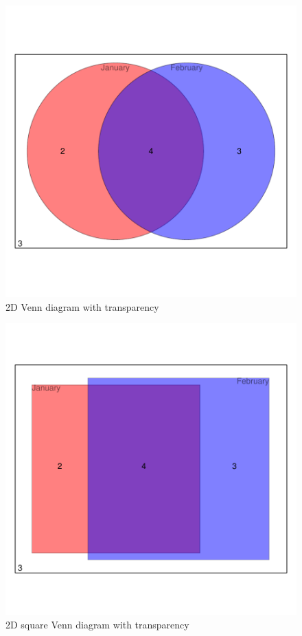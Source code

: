 \documentclass[a4paper]{article}
\begin{document}
\begin{figure}[H]
  \begin{center}
\includegraphics{Vennfig-p2utransp}
  \caption{ 2D Venn diagram with transparency}
  \end{center}
\end{figure}


\begin{figure}[H]
  \begin{center}
\includegraphics{Vennfig-sq2utransp}
  \caption{ 2D square Venn diagram with transparency}
  \end{center}
\end{figure}
\end{document}
